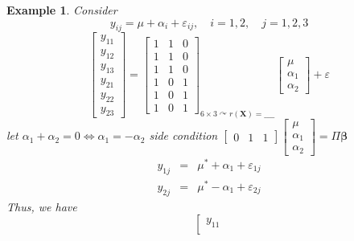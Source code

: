 \documentclass{article}
\newtheorem{example}[theorem]{Example}
\begin{document}
\begin{example}
Consider%
\begin{equation*}
y_{ij}=\mu +\alpha _{i}+\varepsilon _{ij},\quad i=1,2,\quad j=1,2,3
\end{equation*}%
\begin{equation*}
\left[ 
\begin{array}{c}
y_{11} \\ 
y_{12} \\ 
y_{13} \\ 
y_{21} \\ 
y_{22} \\ 
y_{23}%
\end{array}%
\right] =\left[ 
\begin{array}{ccc}
1 & 1 & 0 \\ 
1 & 1 & 0 \\ 
1 & 1 & 0 \\ 
1 & 0 & 1 \\ 
1 & 0 & 1 \\ 
1 & 0 & 1%
\end{array}%
\right] _{6\times 3\curvearrowright r\left( \mathbf{X}\right) =\_\_\_\_}%
\left[ 
\begin{array}{c}
\mu \\ 
\alpha _{1} \\ 
\alpha _{2}%
\end{array}%
\right] +\varepsilon
\end{equation*}%
\newline
let $\alpha _{1}+\alpha _{2}=0\Leftrightarrow \alpha _{1}=-\alpha _{2}$%
\newline
\newline
side condition $\left[ 
\begin{array}{ccc}
0 & 1 & 1%
\end{array}%
\right] \left[ 
\begin{array}{c}
\mu \\ 
\alpha _{1} \\ 
\alpha _{2}%
\end{array}%
\right] =\Pi \mathbf{\beta }$%
\begin{eqnarray*}
y_{1j} &=&\mu ^{\ast }+\alpha _{1}+\varepsilon _{1j} \\
y_{2j} &=&\mu ^{\ast }-\alpha _{1}+\varepsilon _{2j}
\end{eqnarray*}%
\newline
Thus, we have%
\begin{equation*}
\left[ 
\begin{array}{c}
y_{11} \\ 

\end{array}
\end{equation*}
\end{example}
\end{document}
